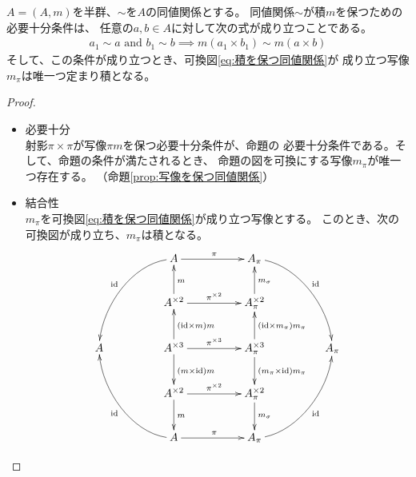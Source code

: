 	\begin{proposition}[積を保つ同値関係]\label{prop:積を保つ同値関係} %
		$A=(A,m)$を半群、$\sim$を$A$の同値関係とする。
		同値関係$\sim$が積$m$を保つための必要十分条件は、
		任意の$a,b\in A$に対して次の式が成り立つことである。
		\begin{equation}\begin{split} %
			a_1\sim a \text{ and } b_1\sim b \implies m(a_1\times b_1)\sim m(a\times b)
		\end{split}\end{equation} %
		そして、この条件が成り立つとき、可換図\eqref{eq:積を保つ同値関係}が
		成り立つ写像$m_{\pi}$は唯一つ定まり積となる。
	\end{proposition} %
	\begin{proof} %
		\begin{itemize}
			\item 必要十分 \\
			射影$\pi\times \pi$が写像$\pi m$を保つ必要十分条件が、命題の
			必要十分条件である。そして、命題の条件が満たされるとき、
			命題の図を可換にする写像$m_\pi$が唯一つ存在する。
			（命題\ref{prop:写像を保つ同値関係}）
			\item 結合性 \\
			$m_{\pi}$を可換図\eqref{eq:積を保つ同値関係}が成り立つ写像とする。
			このとき、次の可換図が成り立ち、$m_{\pi}$は積となる。
			\begin{equation}\xymatrix@C+2pc{
				& A \ar[r]^{\pi} \ar@(l,u)[ddl]_{\myid} & A_{\pi} \ar@(r,u)[ddr]^{\myid}\\
				& A^{\times 2} \ar[r]^{\pi^{\times 2}} \ar[u]_{m} & A_{\pi}^{\times 2} \ar[u]_{m_{\sigma}} \\
				A & A^{\times 3} \ar[r]^{\pi^{\times 3}} \ar[u]_{(\myid\times m)m} \ar[d]^{(m\times \myid)m}
				& A_{\pi}^{\times 3} \ar[u]_{(\myid\times m_\pi)m_\pi} \ar[d]^{(m_\pi\times \myid)m_\pi}
				& A_{\pi} \\
				& A^{\times 2} \ar[r]^{\pi^{\times 2}} \ar[d]^{m} & A_{\pi}^{\times 2} \ar[d]^{m_{\sigma}} \\
				& A \ar[r]^{\pi} \ar@(l,d)[uul]^{\myid} & A_{\pi} \ar@(r,d)[uur]_{\myid}\\
			}\end{equation}
		\end{itemize}
	\end{proof} %

